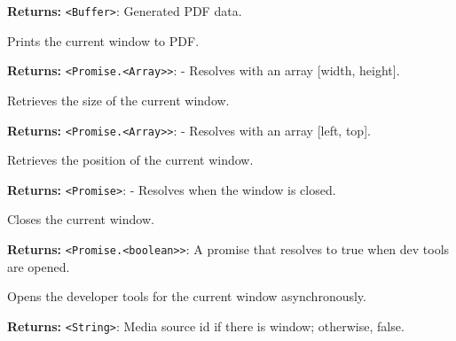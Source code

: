 \documentclass[12pt,a4paper]{article}
\begin{document}
\noindent \textbf{Returns:} \texttt{<Buffer>}: Generated PDF data.

\noindent Prints the current window to PDF.

\vspace{5mm}
\noindent {}


\noindent \textbf{Returns:} \texttt{<Promise.<Array>>}: - Resolves with an array [width, height].

\noindent Retrieves the size of the current window.

\vspace{5mm}
\noindent {}


\noindent \textbf{Returns:} \texttt{<Promise.<Array>>}: - Resolves with an array [left, top].

\noindent Retrieves the position of the current window.

\vspace{5mm}
\noindent {}


\noindent \textbf{Returns:} \texttt{<Promise>}: - Resolves when the window is closed.

\noindent Closes the current window.

\vspace{5mm}
\noindent {}


\noindent \textbf{Returns:} \texttt{<Promise.<boolean>>}: A promise that resolves to true when dev tools are opened.

\noindent Opens the developer tools for the current window asynchronously.

\vspace{5mm}
\noindent {}


\noindent \textbf{Returns:} \texttt{<String>}: Media source id if there is window; otherwise, false.
\end{document}
